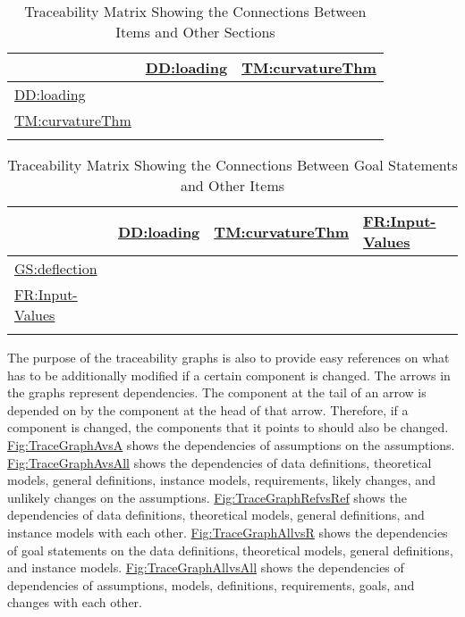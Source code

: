 \documentclass[12pt]{article}
\begin{document}
\begin{longtable}{l l l}
\toprule
\textbf{} & \textbf{\hyperref[DD:loading]{DD:loading}} & \textbf{\hyperref[TM:curvatureThm]{TM:curvatureThm}}
\\
\midrule
\endhead
\hyperref[DD:loading]{DD:loading} &  & 
\\
\hyperref[TM:curvatureThm]{TM:curvatureThm} &  & 
\\
\bottomrule
\caption{Traceability Matrix Showing the Connections Between Items and Other Sections}
\label{Table:TraceMatRefvsRef}
\end{longtable}
\begin{longtable}{l l l l}
\toprule
\textbf{} & \textbf{\hyperref[DD:loading]{DD:loading}} & \textbf{\hyperref[TM:curvatureThm]{TM:curvatureThm}} & \textbf{\hyperref[inputValues]{FR:Input-Values}}
\\
\midrule
\endhead
\hyperref[deflection]{GS:deflection} &  &  & 
\\
\hyperref[inputValues]{FR:Input-Values} &  &  & 
\\
\bottomrule
\caption{Traceability Matrix Showing the Connections Between Goal Statements and Other Items}
\label{Table:TraceMatAllvsR}
\end{longtable}
The purpose of the traceability graphs is also to provide easy references on what has to be additionally modified if a certain component is changed. The arrows in the graphs represent dependencies. The component at the tail of an arrow is depended on by the component at the head of that arrow. Therefore, if a component is changed, the components that it points to should also be changed. \hyperref[Figure:TraceGraphAvsA]{Fig:TraceGraphAvsA} shows the dependencies of assumptions on the assumptions. \hyperref[Figure:TraceGraphAvsAll]{Fig:TraceGraphAvsAll} shows the dependencies of data definitions, theoretical models, general definitions, instance models, requirements, likely changes, and unlikely changes on the assumptions. \hyperref[Figure:TraceGraphRefvsRef]{Fig:TraceGraphRefvsRef} shows the dependencies of data definitions, theoretical models, general definitions, and instance models with each other. \hyperref[Figure:TraceGraphAllvsR]{Fig:TraceGraphAllvsR} shows the dependencies of goal statements on the data definitions, theoretical models, general definitions, and instance models. \hyperref[Figure:TraceGraphAllvsAll]{Fig:TraceGraphAllvsAll} shows the dependencies of dependencies of assumptions, models, definitions, requirements, goals, and changes with each other.
\end{document}

